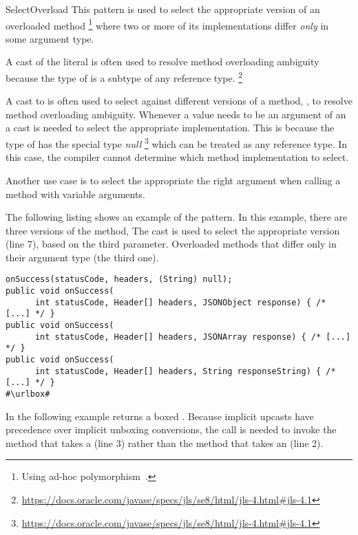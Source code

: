 \begin{pattern}{SelectOverload}
This pattern is used to select the appropriate version of an overloaded method%
\footnote{Using ad-hoc polymorphism~\citep{stracheyFundamentalConceptsProgramming2000}.}
where two or more of its implementations differ \emph{only} in some argument type.

A cast of the  literal is often used to resolve method overloading ambiguity because the type of  is a subtype of any reference type.%
\footnote{\url{https://docs.oracle.com/javase/specs/jls/se8/html/jls-4.html\#jls-4.1}}

A cast to  is often used to select against different versions of a method,
\ie{}, to resolve method overloading ambiguity.
Whenever a  value needs to be an argument of an a cast is
needed to select the appropriate implementation.
This is because the type of  has the special type \emph{null}%
\footnote{\url{https://docs.oracle.com/javase/specs/jls/se8/html/jls-4.html\#jls-4.1}}
which can be treated as any reference type.
In this case,
the compiler cannot determine which method implementation to select.

Another use case is to select the appropriate the right argument when calling a method with variable arguments.

\instances{}
The following listing shows an example of the \thisp{} pattern.
In this example, there are three versions of the  method,
The cast  is used to select the appropriate version
(line 7), based on the third parameter.
Overloaded methods that differ only in their argument type (the third one).

\def\urlvar{http://bit.ly/loopj_android_async_http_2FENovD}
\begin{verbatim}
onSuccess(statusCode, headers, (String) null);
public void onSuccess(
      int statusCode, Header[] headers, JSONObject response) { /* [...] */ }
public void onSuccess(
      int statusCode, Header[] headers, JSONArray response) { /* [...] */ }
public void onSuccess(
      int statusCode, Header[] headers, String responseString) { /* [...] */ }
#\urlbox#
\end{verbatim}

In the following example  returns a boxed .
Because implicit upcasts have precedence over implicit unboxing conversions,
the call is needed to invoke the method that takes a  (line 3) rather than the method that takes an  (line 2).


\end{pattern}
